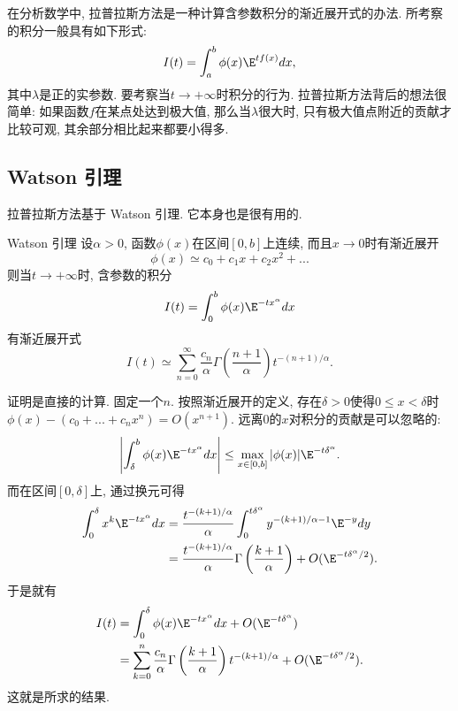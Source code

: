 

在分析数学中, 拉普拉斯方法是一种计算含参数积分的渐近展开式的办法. 所考察的积分一般具有如下形式:
\begin{equation}\label{LapAsm_eq1}
I(t)=\int_a^b \phi(x)\E^{t f(x)}dx,
\end{equation}
其中$\lambda$是正的实参数. 要考察当$t\to+\infty$时积分的行为. 拉普拉斯方法背后的想法很简单: 如果函数$f$在某点处达到极大值, 那么当$\lambda$很大时, 只有极大值点附近的贡献才比较可观, 其余部分相比起来都要小得多.

\subsection{Watson 引理}
拉普拉斯方法基于 Watson 引理. 它本身也是很有用的.

\begin{lemma}{Watson 引理}
设$\alpha>0$, 函数$\phi(x)$在区间$[0,b]$上连续, 而且$x\to0$时有渐近展开
$$
\phi(x)\simeq c_0+c_1x+c_2x^2+...
$$
则当$t\to+\infty$时, 含参数的积分
$$
I(t)=\int_0^b \phi(x)\E^{-t x^\alpha}dx
$$
有渐近展开式
$$
I(t)\simeq\sum_{n=0}^\infty \frac{c_n}{\alpha}\Gamma\left(\frac{n+1}{\alpha}\right)t^{-(n+1)/\alpha}.
$$
\end{lemma}

证明是直接的计算. 固定一个$n$. 按照渐近展开的定义, 存在$\delta>0$使得$0\leq x<\delta$时$\phi(x)-(c_0+...+c_nx^n)=O(x^{n+1})$. 远离$0$的$x$对积分的贡献是可以忽略的:
$$
\left|\int_\delta^b\phi(x)\E^{-tx^\alpha}dx\right|
\leq\max_{x\in[0,b]}|\phi(x)|\E^{-t\delta^\alpha}.
$$
而在区间$[0,\delta]$上, 通过换元可得
$$
\begin{aligned}
\int_0^\delta x^k\E^{-tx^\alpha}dx
&=\frac{t^{-(k+1)/\alpha}}{\alpha}\int_0^{t\delta^\alpha}y^{-(k+1)/\alpha-1}\E^{-y}dy\\
&=\frac{t^{-(k+1)/\alpha}}{\alpha}\Gamma\left(\frac{k+1}{\alpha}\right)+O(\E^{-t\delta^\alpha/2}).
\end{aligned}
$$
于是就有
$$
\begin{aligned}
I(t)
&=\int_0^\delta\phi(x)\E^{-tx^\alpha}dx+O(\E^{-t\delta^\alpha})\\
&=\sum_{k=0}^n\frac{c_n}{\alpha}\Gamma\left(\frac{k+1}{\alpha}\right)t^{-(k+1)/\alpha}+O(\E^{-t\delta^\alpha/2}).
\end{aligned}
$$
这就是所求的结果.

